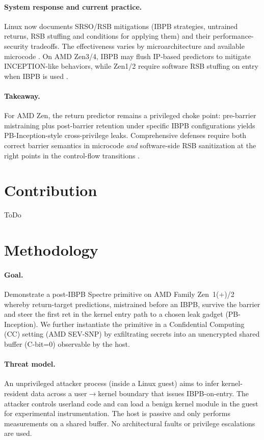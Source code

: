 \documentclass[11pt,a4paper]{article}
\begin{document}
\paragraph{System response and current practice.}
Linux now documents SRSO/RSB mitigations (IBPB strategies, untrained returns, RSB stuffing and conditions for applying them) and their performance-security tradeoffs. The effectiveness varies by microarchitecture and available microcode \cite{linux_srso_doc,linux_rsb_doc}. On AMD Zen3/4, IBPB may flush IP-based predictors to mitigate INCEPTION-like behaviors, while Zen1/2 require software RSB stuffing on entry when IBPB is used \cite{wikner2025breaking,amd_srso_whitepaper}.

\paragraph{Takeaway.}
For AMD Zen, the return predictor remains a privileged choke point: pre-barrier mistraining plus post-barrier retention under specific IBPB configurations yields PB-Inception-style cross-privilege leaks. Comprehensive defenses require both correct barrier semantics in microcode \emph{and} software-side RSB sanitization at the right points in the control-flow transitions \cite{wikner2025breaking,trujillo2023inception,linux_srso_doc}.

\section{Contribution}
ToDo

\section{Methodology}

\paragraph{Goal.}
Demonstrate a post-IBPB Spectre primitive on AMD Family Zen~1(+)/2 whereby return-target predictions, mistrained before an IBPB, survive the barrier and steer the first ret in the kernel entry path to a chosen leak gadget (PB-Inception). We further instantiate the primitive in a Confidential Computing (CC) setting (AMD SEV-SNP) by exfiltrating secrets into an unencrypted shared buffer (C-bit=0) observable by the host.

\paragraph{Threat model.}
An unprivileged attacker process (inside a Linux guest) aims to infer kernel-resident data across a user$\rightarrow$kernel boundary that issues IBPB-on-entry. The attacker controls userland code and can load a benign kernel module in the guest for experimental instrumentation. The host is passive and only performs measurements on a shared buffer. No architectural faults or privilege escalations are used.
\end{document}
